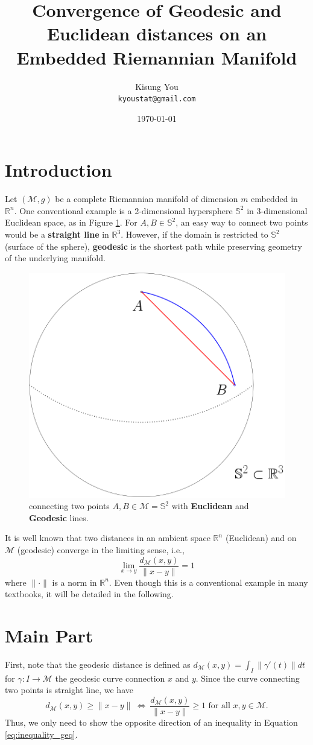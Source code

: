 \documentclass[fontsize=12pt]{article}
\title{Convergence of Geodesic and Euclidean distances on an Embedded Riemannian Manifold}
\author{
	Kisung You\\
	\texttt{kyoustat@gmail.com}
}
\date{\today}
\newcommand{\calM}{\mathcal{M}}
\begin{document}
\maketitle

\section{Introduction}

Let $(\calM,g)$ be a complete Riemannian manifold of dimension $m$ embedded in $\mathbb{R}^n$. One conventional example is a 2-dimensional hypersphere $\mathbb{S}^2$ in 3-dimensional Euclidean space, as in Figure \ref{fig:sphere}. For $A, B \in \mathbb{S}^2$, an easy way to connect two points would be a {\color{red}\bf straight line} in $\mathbb{R}^3$. However, if the domain is restricted to $\mathbb{S}^2$ (surface of the sphere), {\color{blue}\bf geodesic} is the shortest path while preserving geometry of the underlying manifold.


\begin{figure}[htbp]
	\centering
	\includegraphics[width=0.55\linewidth]{figure_twodist.png}
	\caption{connecting two points $A, B \in \calM = \mathbb{S}^2$ with {\color{red} \bf Euclidean} and {\color{blue} \bf Geodesic} lines.}
	\label{fig:sphere}
\end{figure}


It is well known that two distances in an ambient space $\mathbb{R}^n$ (Euclidean) and on $\calM$ (geodesic) converge in the limiting sense, i.e., 
\begin{equation}
\lim_{x\rightarrow y} \frac{d_\calM(x,y)}{\|x-y\|} = 1 \label{eq:theorem}
\end{equation}
where $\| \cdot \|$ is a norm in $\mathbb{R}^n$. Even though this is a conventional example in many textbooks, it will be detailed in the following.


\newpage
\section{Main Part}
First, note that the geodesic distance is defined as $d_\calM (x,y) = \int_I \| \gamma'(t) \| dt$ for $\gamma:I \rightarrow \calM$ the geodesic curve connection $x$ and $y$. Since the curve connecting two points is straight line, we have 
\begin{equation}
d_\calM (x,y) \geq \|x-y\| ~ \Longleftrightarrow ~ \frac{d_\calM(x,y)}{\|x-y\|} \geq 1 \text{ for all } x,y \in \calM. \label{eq:inequality_geq}
\end{equation} 
Thus, we only need to show the opposite direction of an inequality in Equation \eqref{eq:inequality_geq}.  
\end{document}
